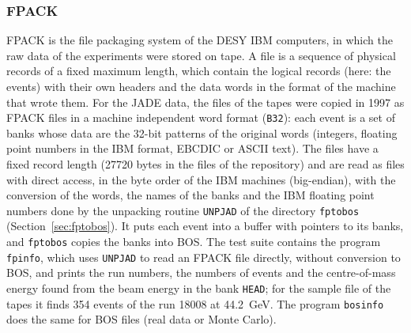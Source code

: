 \subsubsection{FPACK}
FPACK is the file packaging system of the DESY IBM computers, in which the raw data of the experiments were stored on tape.
A file is a sequence of physical records of a fixed maximum length, which contain the logical records (here: the events) with their own headers
and the data words in the format of the machine that wrote them. For the JADE data, the files of the tapes were copied in 1997 as
FPACK files in a machine independent word format (\texttt{B32}): each event is a set of banks whose data are the 32-bit patterns of the original words
(integers, floating point numbers in the IBM format, EBCDIC or ASCII text). The files have a fixed record length (27720 bytes in the files of the repository)
and are read as files with direct access, in the byte order of the IBM machines (big-endian), with the conversion of the words, the names of the banks and the
IBM floating point numbers done by the unpacking routine \texttt{UNPJAD} of the directory \texttt{fptobos} (Section~\ref{sec:fptobos}). It puts each event
into a buffer with pointers to its banks, and \texttt{fptobos} copies the banks into BOS.
The test suite contains the program \texttt{fpinfo}, which uses \texttt{UNPJAD} to read an FPACK file directly, without conversion to BOS, and prints the run numbers, the numbers of events
and the centre-of-mass energy found from the beam energy in the bank \texttt{HEAD}; for the sample file of the tapes it finds 354 events of the run 18008 at 44.2~GeV.
The program \texttt{bosinfo} does the same for BOS files (real data or Monte Carlo).

